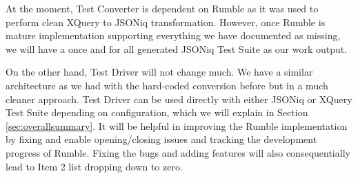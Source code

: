 

At the moment, Test Converter is dependent on Rumble as it was used to perform clean XQuery to JSONiq transformation. However, once Rumble is mature implementation supporting everything we have documented as missing, we will have a once and for all generated JSONiq Test Suite as our work output. 

On the other hand, Test Driver will not change much. We have a similar architecture as we had with the hard-coded conversion before but in a much cleaner approach. Test Driver can be used directly with either JSONiq or XQuery Test Suite depending on configuration, which we will explain in Section \ref{sec:overallsummary}. It will be helpful in improving the Rumble implementation by fixing and enable opening/closing issues and tracking the development progress of Rumble. Fixing the bugs and adding features will also consequentially lead to Item 2 list dropping down to zero. 
